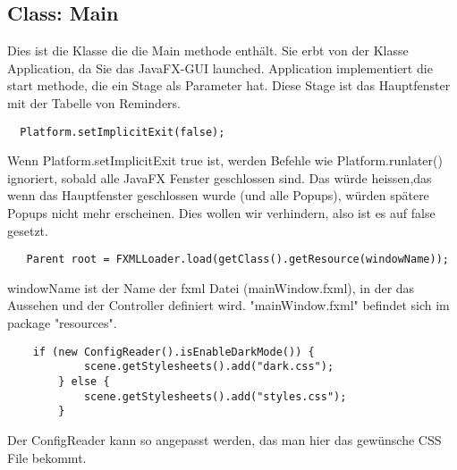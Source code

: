 \subsection{Class: Main}
Dies ist die Klasse die die Main methode enthält. Sie erbt von der Klasse Application, da Sie das JavaFX-GUI launched.
Application implementiert die start methode, die ein Stage als Parameter hat. Diese Stage ist das Hauptfenster mit der Tabelle von Reminders.

\begin{lstlisting}
  Platform.setImplicitExit(false);
\end{lstlisting}
Wenn Platform.setImplicitExit true ist, werden Befehle wie Platform.runlater() ignoriert, sobald alle JavaFX Fenster geschlossen sind.
Das würde heissen,das wenn das Hauptfenster geschlossen wurde (und alle Popups), würden spätere Popups nicht mehr erscheinen.
Dies wollen wir verhindern, also ist es auf false gesetzt.

\begin{lstlisting}
   Parent root = FXMLLoader.load(getClass().getResource(windowName));
\end{lstlisting}
windowName ist der Name der fxml Datei (mainWindow.fxml), in der das Aussehen und der Controller definiert wird. "mainWindow.fxml" befindet sich im package "resources".


\begin{lstlisting}
    if (new ConfigReader().isEnableDarkMode()) {
            scene.getStylesheets().add("dark.css");
        } else {
            scene.getStylesheets().add("styles.css");
        }
\end{lstlisting}
Der ConfigReader kann so angepasst werden, das man hier das gewünsche CSS File bekommt.
